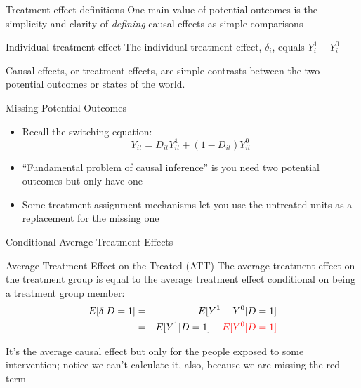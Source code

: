 \documentclass{beamer}
\begin{document}
\begin{frame}{Treatment effect definitions}
	One main value of potential outcomes is the simplicity and clarity of \emph{defining} causal effects as simple comparisons


	\begin{block}{Individual treatment effect}
	    The individual treatment effect,  $\delta_i$, equals $Y_i^1-Y_i^0$
	\end{block}
	
	Causal effects, or treatment effects, are simple contrasts between the two potential outcomes or states of the world. 
	

	
\end{frame}

\begin{frame}{Missing Potential Outcomes}

\begin{itemize}
\item Recall the switching equation:  $$Y_{it}=D_{it}Y_{it}^1 + (1-D_{it})Y_{it}^0$$ 
\item ``Fundamental problem of causal inference'' is you need two potential outcomes but only have one
\item Some treatment assignment mechanisms let you use the untreated units as a replacement for the missing one
\end{itemize}

\end{frame}


\begin{frame}{Conditional Average Treatment Effects}	
	\begin{block}{Average Treatment Effect on the Treated (ATT)}
	The average treatment effect on the treatment group is equal to the average treatment effect conditional on being a treatment group member:
		\begin{eqnarray*}
		E[\delta|D=1]&=&E[Y^1-Y^0|D=1] \nonumber \\
		&=&E[Y^1|D=1]-\textcolor{red}{E[Y^0|D=1]}
		\end{eqnarray*}
	\end{block}
	
	\bigskip

It's the average causal effect but only for the people exposed to some intervention; notice we can't calculate it, also, because we are missing the red term

	
\end{frame}
\end{document}
